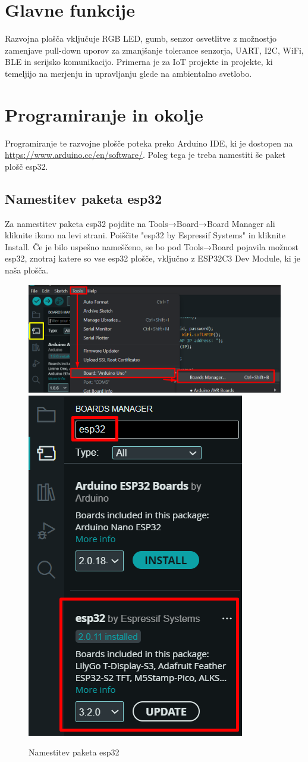 \section{Glavne funkcije}
Razvojna plošča vključuje RGB LED, gumb, senzor osvetlitve z možnostjo zamenjave pull-down uporov za zmanjšanje tolerance senzorja, UART, I2C, WiFi, BLE in serijsko komunikacijo. Primerna je za IoT projekte in projekte, ki temeljijo na merjenju in upravljanju glede na ambientalno svetlobo.

\section{Programiranje in okolje}
Programiranje te razvojne plošče poteka preko Arduino IDE, ki je dostopen na \url{https://www.arduino.cc/en/software/}. Poleg tega je treba namestiti še paket plošč esp32.

\subsection{Namestitev paketa esp32}
Za namestitev paketa esp32 pojdite na Tools→Board→Board Manager ali kliknite ikono na levi strani. Poiščite "esp32 by Espressif Systems" in kliknite Install. Če je bilo uspešno nameščeno, se bo pod Tools→Board pojavila možnost esp32, znotraj katere so vse esp32 plošče, vključno z ESP32C3 Dev Module, ki je naša plošča.

\begin{figure}[H]
    \centering
    \includegraphics[width=0.9\linewidth]{Imgs/boardsetup1.png}
    \includegraphics[width=0.5\linewidth]{Imgs/boardsetup2.png}
    \caption{Namestitev paketa esp32}
    \label{fig:enter-label}
\end{figure}

